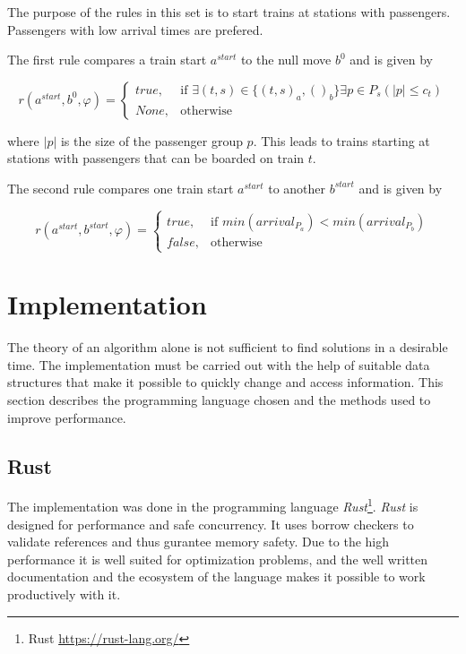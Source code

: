 \documentclass[a4paper,10pt,parskip]{article}
\begin{document}
\noindent The purpose of the rules in this set is to start trains at stations 
with passengers. Passengers with low arrival times are prefered.

The first rule compares a train start $a^{start}$ to the null move $b^0$ and is given by

\[
    r(a^{start}, b^{0}, \varphi) = 
    \begin{cases}
        true,& \text{if } \exists (t,s) \in \{(t,s)_a, ()_b\} \exists p \in P_s (|p| \leq c_t)\\
        None,& \text{otherwise}
    \end{cases}
\]

\noindent where $|p|$ is the size of the passenger group $p$. This leads to trains starting 
at stations with passengers that can be boarded on train $t$.

The second rule compares one train start $a^{start}$ to another $b^{start}$ and 
is given by

\[
    r(a^{start}, b^{start}, \varphi) = 
    \begin{cases}
        true,& \text{if } min(arrival_P_a) < min(arrival_P_b) \\
        false,& \text{otherwise}
    \end{cases}
\]

\section{Implementation}

The theory of an algorithm alone is not sufficient to find solutions in a 
desirable time. The implementation must be carried out with the help of suitable 
data structures that make it possible to quickly change and access information. 
This section describes the programming language chosen and the methods used to 
improve performance.

\subsection{Rust}

The implementation was done in the programming language 
\emph{Rust}\footnote{Rust \url{https://rust-lang.org/}}. \emph{Rust} is designed 
for performance and safe concurrency. It uses borrow checkers to validate references 
and thus gurantee memory safety. Due to the high performance it is well suited for 
optimization problems, and the well written documentation and the ecosystem of the 
language makes it possible to work productively with it.
\end{document}
